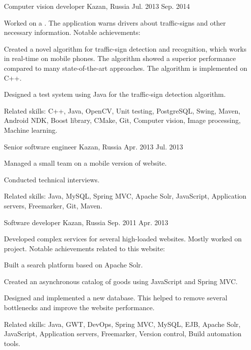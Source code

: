 \begin{cventries}
  \cventry
    {Computer vision developer} %
    {} %
    {Kazan, Russia} %
    {Jul. 2013 \textemdash{} Sep. 2014} %
    {
    Worked on a . The application warns drivers about traffic-signs and other necessary information. Notable achievements:
      \begin{cvitems}
      \item{Created a novel algorithm for traffic-sign detection and recognition, which works in real-time on mobile phones. The algorithm showed a superior performance compared to many state-of-the-art approaches. The algorithm is implemented on C++.}
      \item{Designed a test system using Java for the traffic-sign detection algorithm.}
      \end{cvitems}
      Related skills: C++, Java, OpenCV, Unit testing, PostgreSQL, Swing, Maven, Android NDK, Boost library, CMake, Git, Computer vision, Image processing, Machine learning.
    }
    
  \cventry
    {Senior software engineer} %
    {} %
    {Kazan, Russia} %
    {Apr. 2013 \textemdash{} Jul. 2013} %
    {
      \begin{cvitems_up}
      \item{Managed a small team on a mobile version of  website.}
      \item{Conducted technical interviews.}
      \end{cvitems_up}
      Related skills: Java, MySQL, Spring MVC, Apache Solr, JavaScript, Application servers, Freemarker, Git, Maven.
    }

  \cventry
    {Software developer} %
    {} %
    {Kazan, Russia} %
    {Sep. 2011 \textemdash{} Apr. 2013} %
    {
    Developed complex services for several high-loaded websites. Mostly worked on  project. Notable achievements related to this website:
      \begin{cvitems}          
      \item{Built a search platform based on Apache Solr.}
      \item{Created an asynchronous catalog of goods using JavaScript and Spring MVC.}
      \item{Designed and implemented a new database. This helped to remove several bottlenecks and improve the website performance.}
      \end{cvitems}
	Related skills: Java, GWT, DevOps, Spring MVC, MySQL, EJB, Apache Solr, JavaScript, Application servers, Freemarker, Version control, Build automation tools.
    }
\end{cventries}
